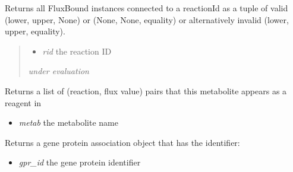 \documentclass[a4paper,11pt,english]{sphinxmanual}
\begin{document}
\begin{fulllineitems}
\begin{fulllineitems}
\begin{itemize}
\end{itemize}

\end{fulllineitems}


\begin{fulllineitems}
\label{modules_doc:cbmpy.CBModel.Model.getFluxBoundsByReactionID}
Returns all FluxBound instances connected to a reactionId as a tuple of valid
(lower, upper, None) or (None, None, equality) or alternatively invalid (lower, upper, equality).
\begin{quote}
\begin{itemize}
\item {} 
\emph{rid} the reaction ID

\end{itemize}

\emph{under evaluation}
\end{quote}

\end{fulllineitems}


\begin{fulllineitems}
\label{modules_doc:cbmpy.CBModel.Model.getFluxesAssociatedWithSpecies}
Returns a list of (reaction, flux value) pairs that this metabolite appears as a reagent in
\begin{itemize}
\item {} 
\emph{metab} the metabolite name

\end{itemize}

\end{fulllineitems}


\begin{fulllineitems}
\label{modules_doc:cbmpy.CBModel.Model.getGPRassociation}
Returns a gene protein association object that has the identifier:
\begin{itemize}
\item {} 
\emph{gpr\_id} the gene protein identifier


\end{itemize}
\end{fulllineitems}
\end{fulllineitems}
\end{document}
